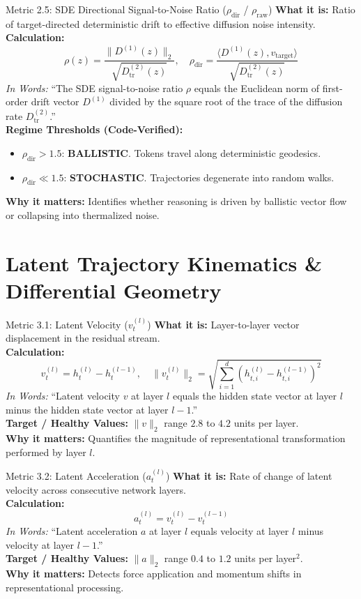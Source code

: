 \documentclass[11pt,a4paper]{article}
\begin{document}
\begin{metricbox}{Metric 2.5: SDE Directional Signal-to-Noise Ratio ($\rho_{\text{dir}}$ / $\rho_{\text{raw}}$)}
\textbf{What it is:} Ratio of target-directed deterministic drift to effective diffusion noise intensity.\\
\textbf{Calculation:}
 $$\rho(z) = \frac{\|D^{(1)}(z)\|_2}{\sqrt{D^{(2)}_{\text{tr}}(z)}}, \quad \rho_{\text{dir}} = \frac{\langle D^{(1)}(z), v_{\text{target}} \rangle}{\sqrt{D^{(2)}_{\text{tr}}(z)}}$$ \emph{In Words:} ``The SDE signal-to-noise ratio $\rho$ equals the Euclidean norm of first-order drift vector $D^{(1)}$ divided by the square root of the trace of the diffusion rate $D^{(2)}_{\text{tr}}$.''\\
\textbf{Regime Thresholds (Code-Verified):}
\begin{itemize}
    \item $\rho_{\text{dir}} > 1.5$: \textbf{BALLISTIC}. Tokens travel along deterministic geodesics.
    \item $\rho_{\text{dir}} \ll 1.5$: \textbf{STOCHASTIC}. Trajectories degenerate into random walks.
\end{itemize}
\textbf{Why it matters:} Identifies whether reasoning is driven by ballistic vector flow or collapsing into thermalized noise.
\end{metricbox}

\section{Latent Trajectory Kinematics \& Differential Geometry}

\begin{metricbox}{Metric 3.1: Latent Velocity ($v^{(l)}_t$)}
\textbf{What it is:} Layer-to-layer vector displacement in the residual stream.\\
\textbf{Calculation:}
 $$v^{(l)}_t = h^{(l)}_t - h^{(l-1)}_t, \quad \|v^{(l)}_t\|_2 = \sqrt{\sum_{i=1}^d \left(h_{t,i}^{(l)} - h_{t,i}^{(l-1)}\right)^2}$$ \emph{In Words:} ``Latent velocity $v$ at layer $l$ equals the hidden state vector at layer $l$ minus the hidden state vector at layer $l-1$.''\\
\textbf{Target / Healthy Values:} $\|v\|_2$ range $2.8$ to $4.2$ units per layer.\\
\textbf{Why it matters:} Quantifies the magnitude of representational transformation performed by layer $l$.
\end{metricbox}

\begin{metricbox}{Metric 3.2: Latent Acceleration ($a^{(l)}_t$)}
\textbf{What it is:} Rate of change of latent velocity across consecutive network layers.\\
\textbf{Calculation:}
 $$a^{(l)}_t = v^{(l)}_t - v^{(l-1)}_t$$ \emph{In Words:} ``Latent acceleration $a$ at layer $l$ equals velocity at layer $l$ minus velocity at layer $l-1$.''\\
\textbf{Target / Healthy Values:} $\|a\|_2$ range $0.4$ to $1.2$ units per layer$^2$.\\
\textbf{Why it matters:} Detects force application and momentum shifts in representational processing.
\end{metricbox}
\end{document}
